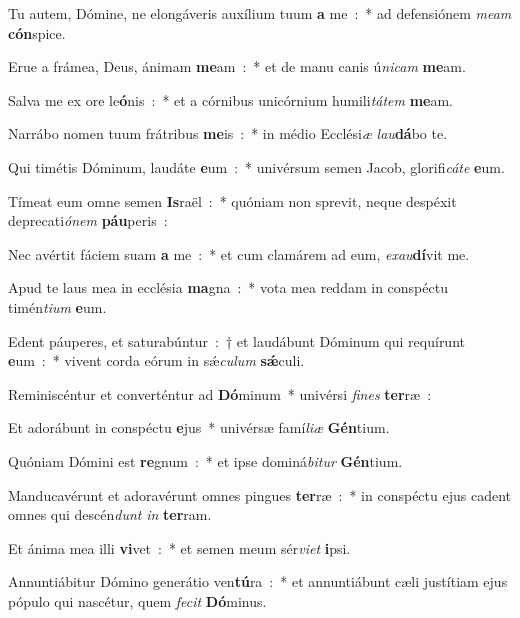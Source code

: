 \item Tu autem, Dómine, ne elongáveris auxílium tuum \textbf{a} me~:~* ad defensiónem \emph{me}\emph{am} \textbf{cón}spice.
\item Erue a frámea, Deus, ánimam \textbf{me}am~:~* et de manu canis ú\emph{ni}\emph{cam} \textbf{me}am.
\item Salva me ex ore le\textbf{ó}nis~:~* et a córnibus unicórnium humili\emph{tá}\emph{tem} \textbf{me}am.
\item Narrábo nomen tuum frátribus \textbf{me}is~:~* in médio Ecclési\emph{æ} \emph{lau}\textbf{dá}bo te.
\item Qui timétis Dóminum, laudáte \textbf{e}um~:~* univérsum semen Jacob, glorifi\emph{cá}\emph{te} \textbf{e}um.
\item Tímeat eum omne semen \textbf{Is}raël~:~* quóniam non sprevit, neque despéxit deprecati\emph{ó}\emph{nem} \textbf{páu}peris~:
\item Nec avértit fáciem suam \textbf{a} me~:~* et cum clamárem ad eum, \emph{ex}\emph{au}\textbf{dí}vit me.
\item Apud te laus mea in ecclésia \textbf{ma}gna~:~* vota mea reddam in conspéctu timén\emph{ti}\emph{um} \textbf{e}um.
\item Edent páuperes, et saturabúntur~:~† et laudábunt Dóminum qui requírunt \textbf{e}um~:~* vivent corda eórum in sǽ\emph{cu}\emph{lum} \textbf{sǽ}culi.
\item Reminiscéntur et converténtur ad \textbf{Dó}minum~* univérsi \emph{fi}\emph{nes} \textbf{ter}ræ~:
\item Et adorábunt in conspéctu \textbf{e}jus~* univérsæ famí\emph{li}\emph{æ} \textbf{Gén}tium.
\item Quóniam Dómini est \textbf{re}gnum~:~* et ipse dominá\emph{bi}\emph{tur} \textbf{Gén}tium.
\item Manducavérunt et adoravérunt omnes pingues \textbf{ter}ræ~:~* in conspéctu ejus cadent omnes qui descén\emph{dunt} \emph{in} \textbf{ter}ram.
\item Et ánima mea illi \textbf{vi}vet~:~* et semen meum sér\emph{vi}\emph{et} \textbf{i}psi.
\item Annuntiábitur Dómino generátio ven\textbf{tú}ra~:~* et annuntiábunt cæli justítiam ejus pópulo qui nascétur, quem \emph{fe}\emph{cit} \textbf{Dó}minus.